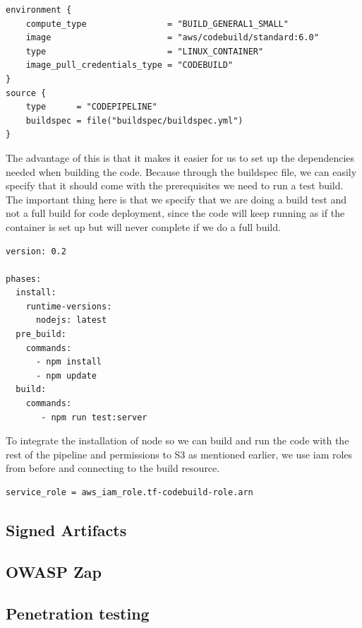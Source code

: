 \begin{tcolorbox}
\begin{verbatim}  
environment {
    compute_type                = "BUILD_GENERAL1_SMALL"
    image                       = "aws/codebuild/standard:6.0"
    type                        = "LINUX_CONTAINER"
    image_pull_credentials_type = "CODEBUILD"
}
source {
    type      = "CODEPIPELINE"
    buildspec = file("buildspec/buildspec.yml")
}
\end{verbatim}
\end{tcolorbox}

The advantage of this is that it makes it easier for us to set up the dependencies needed when building the code. Because through the \gls{buildspec} file, we can easily specify that it should come with the prerequisites we need to run a test build. The important thing here is that we specify that we are doing a build test and not a full build for code deployment, since the code will keep running as if the container is set up but will never complete if we do a full build.
\begin{tcolorbox}
\begin{verbatim}
version: 0.2

phases:
  install:
    runtime-versions:
      nodejs: latest
  pre_build:
    commands:
      - npm install
      - npm update
  build:
    commands:
       - npm run test:server
\end{verbatim}
\end{tcolorbox}

To integrate the installation of node so we can build and run the code with the rest of the pipeline and permissions to S3 as mentioned earlier, we use \acrshort{iam} roles from before and connecting to the build resource.

\begin{tcolorbox}
\begin{verbatim}
service_role = aws_iam_role.tf-codebuild-role.arn
\end{verbatim}
\end{tcolorbox}


\subsection{Signed Artifacts}


\subsection{OWASP Zap}


\subsection{Penetration testing}



